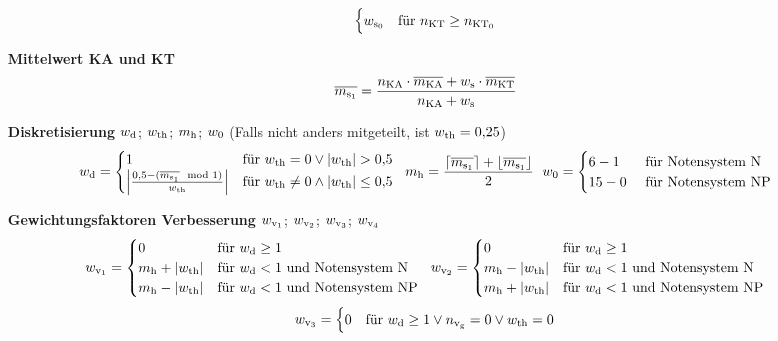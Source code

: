 \begin{enumerate}[label=\textbf{\textbullet}, align=left, leftmargin=*]
\[\begin{cases}
		w_{\mathrm{s}_0} & \text{für }    n_{\mathrm{KT}} \geq n_{\mathrm{KT}_0} \\
	\end{cases}
	\]	
	\item[\textbf{Mittelwert KA und KT}] \vspace{-0.5cm}
	\[
	\overline{m_{\mathrm{s}_1}} = \frac{ n_{\mathrm{KA}} \cdot \overline{m_{\mathrm{KA}}} + w_{\mathrm{s}} \cdot \overline{m_{\mathrm{KT}}} }{n_{\mathrm{KA}} + w_{\mathrm{s}}}
	\]
	\item[\textbf{Diskretisierung}] $w_{\mathrm{d}}$; $w_{\mathrm{th}}$; $m_{\mathrm{h}}$; $w_{0}$ (Falls nicht anders mitgeteilt, ist $w_{\mathrm{th}}=0{,}25$) \cite{wikigaussklammer,wikibetrag,wikimodulo}
	\[
	w_{\mathrm{d}} = 
	\begin{cases}
		1 & \text{für }  w_{\mathrm{th}} = 0 \lor \left | w_{\mathrm{th}} \right | > 0{,}5\\
		\left| \frac{0{,}5 - (\overline{m_{\mathrm{s}_1}} \mod 1)}{w_{\mathrm{th}}} \right| & \text{für } w_{\mathrm{th}} \neq 0 \land  \left | w_{\mathrm{th}} \right | \leq 0{,}5
	\end{cases}
	\,\hspace{0.1cm}\,
	m_{\mathrm{h}} = \frac{\lceil \overline{m_{\mathrm{s}_1}} \rceil + \lfloor \overline{m_{\mathrm{s}_1}} \rfloor}{2}
	\,\hspace{0.1cm}\,
	w_{0} =
	\begin{cases}
		6-1 & \text{ für Notensystem N} \\
		15 - 0 & \text{ für Notensystem NP} \\
	\end{cases}
	\]
	\item[\textbf{Gewichtungsfaktoren Verbesserung}] $w_{\mathrm{v}_1}$; $w_{\mathrm{v}_2}$; $w_{\mathrm{v}_3}$; $w_{\mathrm{v}_4}$ \cite{wikilog}
	\[
	w_{\mathrm{v}_1} =
	\begin{cases}
		0 & \text{für }  w_{\mathrm{d}} \geq 1 \\
		m_{\mathrm{h}} + \left | w_{\mathrm{th}} \right | & \text{für }    w_{\mathrm{d}} < 1 \text{ und Notensystem N} \\
		m_{\mathrm{h}} - \left | w_{\mathrm{th}} \right |& \text{für }    w_{\mathrm{d}} < 1 \text{ und Notensystem NP} \\
	\end{cases}
	\,\,\,\,
	w_{\mathrm{v}_2} =
	\begin{cases}
		0 & \text{für }  w_{\mathrm{d}} \geq 1 \\
		m_{\mathrm{h}} - \left | w_{\mathrm{th}} \right | & \text{für }    w_{\mathrm{d}} < 1 \text{ und Notensystem N} \\
		m_{\mathrm{h}} + \left | w_{\mathrm{th}} \right | & \text{für }    w_{\mathrm{d}} < 1 \text{ und Notensystem NP} \\
	\end{cases}
	\]
	\vspace{-0.18cm}
	\[
	w_{\mathrm{v}_3} =
	\begin{cases}
		0 & \text{für } w_{\mathrm{d}} \geq 1 \lor n_{\mathrm{v}_\mathrm{g}}=0 \lor w_{\mathrm{th}} = 0\\

\end{cases}\]
\end{enumerate}
